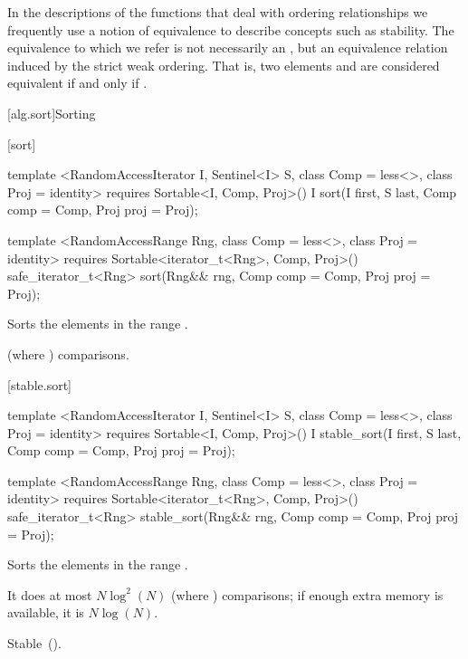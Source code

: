 \pnum
In the descriptions of the functions that deal with ordering relationships we frequently use a notion of
equivalence to describe concepts such as stability.
The equivalence to which we refer is not necessarily an
,
but an equivalence relation induced by the strict weak ordering.
That is, two elements
and
are considered equivalent if and only if
.

[alg.sort]{Sorting}

[sort]{}

%
\begin{itemdecl}
template <RandomAccessIterator I, Sentinel<I> S, class Comp = less<>,
    class Proj = identity>
  requires Sortable<I, Comp, Proj>()
  I sort(I first, S last, Comp comp = Comp{}, Proj proj = Proj{});

template <RandomAccessRange Rng, class Comp = less<>, class Proj = identity>
  requires Sortable<iterator_t<Rng>, Comp, Proj>()
  safe_iterator_t<Rng>
    sort(Rng&& rng, Comp comp = Comp{}, Proj proj = Proj{});
\end{itemdecl}

\begin{itemdescr}
\pnum
\effects
Sorts the elements in the range
.

\pnum
\complexity
{}
(where
)
comparisons.
\end{itemdescr}

[stable.sort]{}

%
\begin{itemdecl}
template <RandomAccessIterator I, Sentinel<I> S, class Comp = less<>,
    class Proj = identity>
  requires Sortable<I, Comp, Proj>()
  I stable_sort(I first, S last, Comp comp = Comp{}, Proj proj = Proj{});

template <RandomAccessRange Rng, class Comp = less<>, class Proj = identity>
  requires Sortable<iterator_t<Rng>, Comp, Proj>()
  safe_iterator_t<Rng>
    stable_sort(Rng&& rng, Comp comp = Comp{}, Proj proj = Proj{});
\end{itemdecl}

\begin{itemdescr}
\pnum
\effects
Sorts the elements in the range .

\pnum
\complexity
It does at most $N \log^2(N)$
(where
)
comparisons; if enough extra memory is available, it is
$N \log(N)$.

\pnum
\remarks Stable~().
\end{itemdescr}


